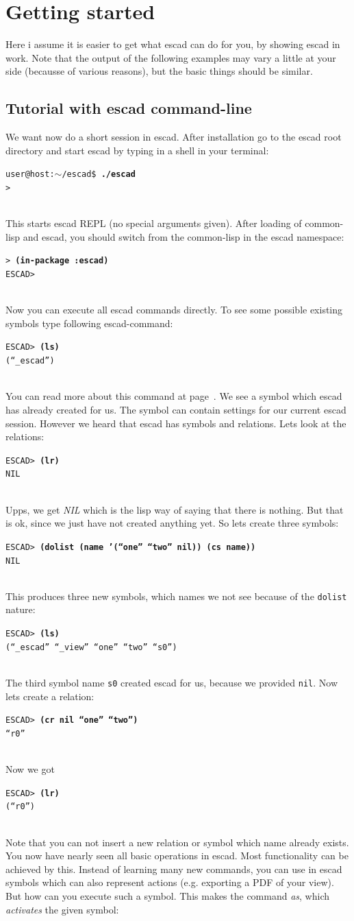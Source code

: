 \documentclass[a4paper, 12pt, openany]{scrbook}
\makeatletter
\newcommand{\shellcmdline}[2]{\\
  \setlength{\fboxsep}{2pt}\colorbox{black!20}{\parbox{\textwidth}{\texttt{user@host:$\sim$/escad\$ \textbf{#1}\\#2}}}\\}
\newcommand{\escadcmdline}[2]{\\\setlength{\fboxsep}{2pt}\colorbox{black!20}{\parbox{\textwidth}{\texttt{ESCAD> \textbf{#1}\\#2}}}\\}
\newcommand{\lispcmdline}[2]{\\\setlength{\fboxsep}{2pt}\colorbox{black!20}{\parbox{\textwidth}{\texttt{> \textbf{#1}\\#2}}}\\}
\makeatother
\begin{document}
\chapter{Getting started}\label{cha:gettingstarted}
Here i assume it is easier to get what escad can do for you, by showing escad in work. Note that the output of the following examples may vary a little at your side (becausse of various reasons), but the basic things should be similar.
\section{Tutorial with escad command-line}
We want now do a short session in escad. After installation go to the escad root directory and start escad by typing in a shell in your terminal:
\shellcmdline{./escad}{>}
This starts escad REPL (no special arguments given). After loading of common-lisp and escad, you should switch from the common-lisp in the escad namespace:
\lispcmdline{(in-package :escad)}{ESCAD>}
Now you can execute all escad commands directly. To see some possible existing symbols type following escad-command:
\escadcmdline{(ls)}{(``\_escad'')}\label{ex:ls}
You can read more about this command at page~\pageref{it:ls}. We see a symbol which escad has already created for us. The symbol can contain settings for our current escad session.
However we heard that escad has symbols and relations. Lets look at the relations:
\escadcmdline{(lr)}{NIL}\label{ex:lr}
Upps, we get \emph{NIL} which is the lisp way of saying that there is nothing. But that is ok, since we just have not created anything yet. So lets create three symbols:
\escadcmdline{(dolist (name '(``one'' ``two'' nil)) (cs name))}{NIL}\label{ex:cs}
This produces three new symbols, which names we not see because of the \texttt{dolist} nature:
\escadcmdline{(ls)}{(``\_escad'' ``\_view'' ``one'' ``two'' ``s0'')}
The third symbol name \texttt{s0} created escad for us, because we provided \texttt{nil}.
Now lets create a relation:
\escadcmdline{(cr nil ``one'' ``two'')}{``r0''}\label{ex:cr}
Now we got
\escadcmdline{(lr)}{(``r0'')}
Note that you can not insert a new relation or symbol which name already exists.
You now have nearly seen all basic operations in escad. Most functionality can be achieved by this. Instead of learning many new commands, you can use in escad symbols which can also represent actions (e.g. exporting a PDF of your view). But how can you execute such a symbol. This makes the command \emph{as}, which \emph{activates} the given symbol:
\end{document}
